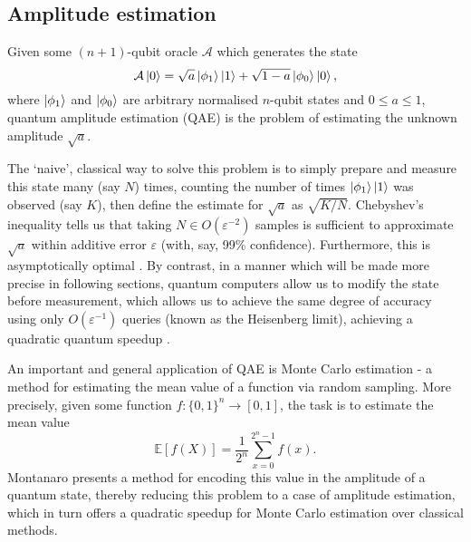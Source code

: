 \subsection{Amplitude estimation}

\begin{problem}
	Given some $(n+1)$-qubit oracle $\mathcal{A}$ which generates the state
	\[
	\mathcal{A} \ket{0} = \sqrt{a} \ket{\phi_1} \ket{1} + \sqrt{1-a} \ket{\phi_0} \ket{0},
	\]
	where $\ket{\phi_1}$ and $\ket{\phi_0}$ are arbitrary normalised $n$-qubit states and $0 \leq a \leq  1$, quantum amplitude estimation (QAE) is the problem of estimating the unknown amplitude $\sqrt{a}$.
\end{problem}

The `naive', classical way to solve this problem is to simply prepare and measure this state many (say $N$) times, counting the number of times $\ket{\phi_1}\ket{1}$ was observed (say $K$), then define the estimate for $\sqrt{a}$ as $\sqrt{K/N}$. Chebyshev's inequality tells us that taking $N \in O(\varepsilon^{-2})$ samples is sufficient to approximate $\sqrt{a}$ within additive error $\varepsilon$ (with, say, 99\% confidence). Furthermore, this is asymptotically optimal \cite{An Optimal Algorithm for Monte Carlo Estimation}. By contrast, in a manner which will be made more precise in following sections, quantum computers allow us to modify the state before measurement, which allows us to achieve the same degree of accuracy using only $O(\varepsilon^{-1})$ queries (known as the Heisenberg limit), achieving a quadratic quantum speedup \cite{Quantum Amplitude Amplification and Estimation}.

An important and general application of QAE is Monte Carlo estimation \cite{Quantum Summation with an Application to Integration, Quantum speedup of Monte Carlo methods, Amplitude estimation without phase estimation} - a method for estimating the mean value of a function via random sampling. More precisely, given some function $f : \{0,1\}^n \rightarrow [0,1]$, the task is to estimate the mean value
\[
\mathbb{E}[f(X)] = \frac{1}{2^n} \sum_{x=0}^{2^n-1} {f(x)}.
\]
Montanaro \cite{Quantum speedup of Monte Carlo methods} presents a method for encoding this value in the amplitude of a quantum state, thereby reducing this problem to a case of amplitude estimation, which in turn offers a quadratic speedup for Monte Carlo estimation over classical methods.


